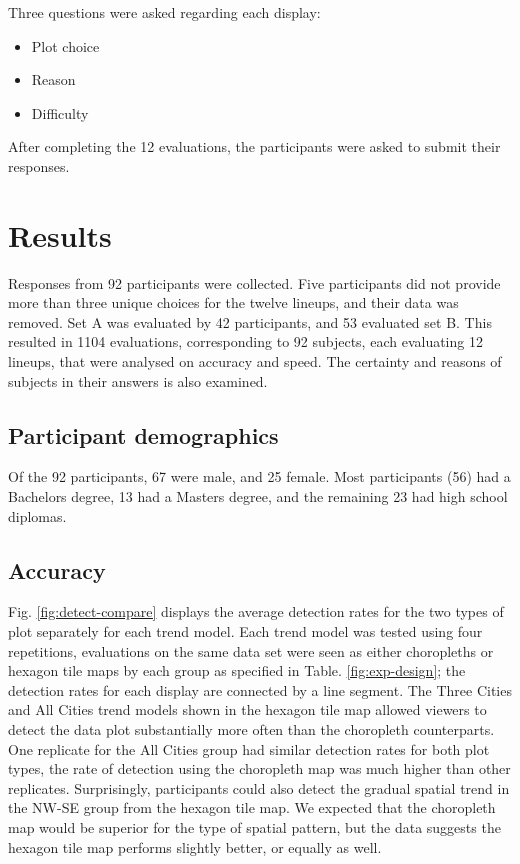\documentclass{monashthesis}
\begin{document}
Three questions were asked regarding each display:

\begin{itemize}
\tightlist
\item
  Plot choice
\item
  Reason
\item
  Difficulty
\end{itemize}

After completing the 12 evaluations, the participants were asked to submit their responses.

\hypertarget{results}{%
\section{Results}\label{results}}

Responses from 92 participants were collected. Five participants did not provide more than three unique choices for the twelve lineups, and their data was removed. Set A was evaluated by 42 participants, and 53 evaluated set B. This resulted in 1104 evaluations, corresponding to 92 subjects, each evaluating 12 lineups, that were analysed on accuracy and speed. The certainty and reasons of subjects in their answers is also examined.

\hypertarget{participant-demographics}{%
\subsection{Participant demographics}\label{participant-demographics}}

Of the 92 participants, 67 were male, and 25 female. Most participants (56) had a Bachelors degree, 13 had a Masters degree, and the remaining 23 had high school diplomas.

\hypertarget{accuracy}{%
\subsection{Accuracy}\label{accuracy}}

Fig. \ref{fig:detect-compare} displays the average detection rates for the two types of plot separately for each trend model. Each trend model was tested using four repetitions, evaluations on the same data set were seen as either choropleths or hexagon tile maps by each group as specified in Table. \ref{fig:exp-design}; the detection rates for each display are connected by a line segment. The Three Cities and All Cities trend models shown in the hexagon tile map allowed viewers to detect the data plot substantially more often than the choropleth counterparts. One replicate for the All Cities group had similar detection rates for both plot types, the rate of detection using the choropleth map was much higher than other replicates. Surprisingly, participants could also detect the gradual spatial trend in the NW-SE group from the hexagon tile map. We expected that the choropleth map would be superior for the type of spatial pattern, but the data suggests the hexagon tile map performs slightly better, or equally as well.
\end{document}
